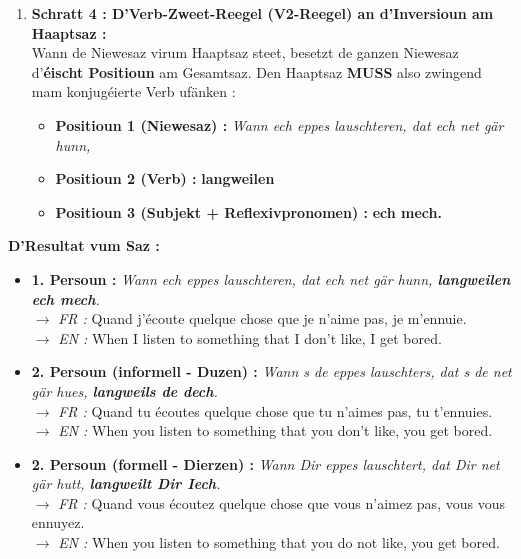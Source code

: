 \begin{enumerate}
    \item \textbf{Schratt 4 : D'Verb-Zweet-Reegel (V2-Reegel) an d'Inversioun am Haaptsaz :} \\
    Wann de Niewesaz virum Haaptsaz steet, besetzt de ganzen Niewesaz d'\textbf{éischt Positioun} am Gesamtsaz. Den Haaptsaz \textbf{MUSS} also zwingend mam konjugéierte Verb ufänken :
    \begin{itemize}
        \item \textbf{Positioun 1 (Niewesaz) :} \textit{Wann ech eppes lauschteren, dat ech net gär hunn,}
        \item \textbf{Positioun 2 (Verb) :} \textbf{langweilen}
        \item \textbf{Positioun 3 (Subjekt + Reflexivpronomen) :} \textbf{ech mech.}
    \end{itemize}
\end{enumerate}

\textbf{D'Resultat vum Saz :}
\begin{itemize}
    \item \textbf{1. Persoun :} \textit{Wann ech eppes lauschteren, dat ech net gär hunn, \textbf{langweilen ech mech}.} \\
    $\rightarrow$ \textit{FR :} Quand j'écoute quelque chose que je n'aime pas, je m'ennuie. \\
    $\rightarrow$ \textit{EN :} When I listen to something that I don't like, I get bored.
    \item \textbf{2. Persoun (informell - Duzen) :} \textit{Wann s de eppes lauschters, dat s de net gär hues, \textbf{langweils de dech}.} \\
    $\rightarrow$ \textit{FR :} Quand tu écoutes quelque chose que tu n'aimes pas, tu t'ennuies. \\
    $\rightarrow$ \textit{EN :} When you listen to something that you don't like, you get bored.
    \item \textbf{2. Persoun (formell - Dierzen) :} \textit{Wann Dir eppes lauschtert, dat Dir net gär hutt, \textbf{langweilt Dir Iech}.} \\
    $\rightarrow$ \textit{FR :} Quand vous écoutez quelque chose que vous n'aimez pas, vous vous ennuyez. \\
    $\rightarrow$ \textit{EN :} When you listen to something that you do not like, you get bored.
\end{itemize}

\vspace{1.5em}

